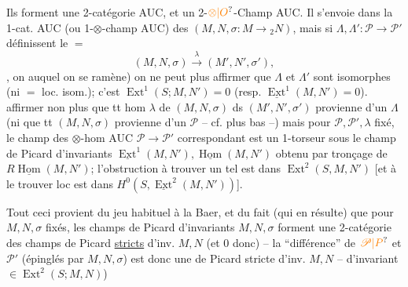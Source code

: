 Ils forment une 2-\inserted{$\otimes$-}catégorie AUC, et  un 2-$\unsure{\otimes|O}$-Champ AUC. Il s'envoie dans la 1-\inserted{$\otimes$-}cat. AUC (ou 1-$\otimes$-champ AUC) des $(M,N,\sigma\colon M\longrightarrow{}_2N)$, mais si $\Lambda,\Lambda'\colon\mathscr P\longrightarrow\mathscr P'$ définissent le $=$
\[
(M,N,\sigma)\xrightarrow{\lambda}(M',N',\sigma'),
\]
, on
auquel on se ramène) on ne peut plus affirmer que $\Lambda$ et $\Lambda'$ sont isomorphes  (ni $=$ loc. isom.); c'est    $\operatorname{Ext}^1(S;M,N')=0$ (resp. $\underline{\operatorname{Ext}}^1(M,N')=0$).  affirmer non plus que tt hom $\lambda$ de $(M,N,\sigma)$ ds $(M',N',\sigma')$ provienne d'un $\Lambda$  \inserted{[c'est OK ssi $\operatorname{Ext}^{\unsure{2|1}}(S;\unsure{M},N')=0$ resp. $\underline{\operatorname{Ext}}^2(M,N')=0$]} (ni que tt $(M,N,\sigma)$ provienne d'un $\mathscr P$ -- cf. plus bas --)
mais pour $\mathscr P,\mathscr P',\lambda$ fixé, le  champ des $\otimes$-hom AUC $\mathscr P\to\mathscr P'$ correspondant est un 1-torseur sous le champ de Picard  d'invariants $\underline{\operatorname{Ext}}^1(M,N'),\underline{\operatorname{Hom}}(M,N')$ obtenu par tronçage de $R\underline{\operatorname{Hom}}(M,N')$; l'obstruction à trouver un tel \inserted{$\Lambda$} est dans $\operatorname{Ext}^2(S,M,N')$ [et à le trouver loc est dans $H^0(S,\underline{\operatorname{Ext}}^2(M,N'))$].

Tout ceci provient du jeu habituel à la Baer, et du fait (qui en résulte) que pour $M,N,\sigma$  fixés, les champs de Picard d'invariants
$M,N,\sigma$ forment une 2-catégorie  des champs de Picard \uline{stricts} d'inv. $M,N$ (et 0 donc) -- la ``différence'' de  $\unsure{\mathscr P|P}$ et $\mathscr P'$ (épinglés par $M,N,\sigma$) est donc une  de Picard stricte d'inv. $M,N$ -- d'invariant $\in\operatorname{Ext}^2(S;M,N)$)

